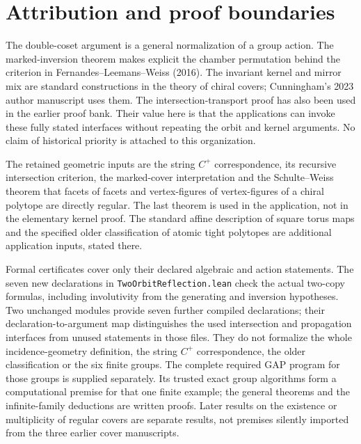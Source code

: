 \section{Attribution and proof boundaries}
The double-coset argument is a general normalization of a group action. The marked-inversion theorem makes explicit the chamber permutation behind the criterion in Fernandes--Leemans--Weiss (2016). The invariant kernel and mirror mix are standard constructions in the theory of chiral covers; Cunningham's 2023 author manuscript uses them. The intersection-transport proof has also been used in the earlier proof bank. Their value here is that the applications can invoke these fully stated interfaces without repeating the orbit and kernel arguments. No claim of historical priority is attached to this organization.

The retained geometric inputs are the string $C^+$ correspondence, its recursive intersection criterion, the marked-cover interpretation and the Schulte--Weiss theorem that facets of facets and vertex-figures of vertex-figures of a chiral polytope are directly regular. The last theorem is used in the application, not in the elementary kernel proof. The standard affine description of square torus maps and the specified older classification of atomic tight polytopes are additional application inputs, stated there.

Formal certificates cover only their declared algebraic and action statements. The seven new declarations in \texttt{TwoOrbitReflection.lean} check the actual two-copy formulas, including involutivity from the generating and inversion hypotheses. Two unchanged modules provide seven further compiled declarations; their declaration-to-argument map distinguishes the used intersection and propagation interfaces from unused statements in those files. They do not formalize the whole incidence-geometry definition, the string $C^+$ correspondence, the older classification or the six finite groups. The complete required GAP program for those groups is supplied separately. Its trusted exact group algorithms form a computational premise for that one finite example; the general theorems and the infinite-family deductions are written proofs. Later results on the existence or multiplicity of regular covers are separate results, not premises silently imported from the three earlier cover manuscripts.

